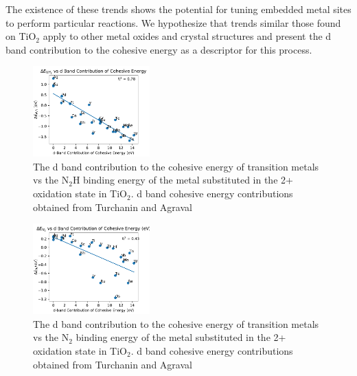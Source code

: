 The existence of these trends shows the potential for tuning embedded metal sites to perform particular reactions. We hypothesize that trends similar those found on TiO$_2$ apply to other metal oxides and crystal structures and present the d band contribution to the cohesive energy as a descriptor for this process.





\begin{figure}
    \centering
    \includegraphics[width=0.4\textwidth]{Images/cohesive_eng_vs_N2H.pdf}
    
    \caption{The d band contribution to the cohesive energy of transition metals vs the N$_2$H binding energy of the metal substituted in the 2+ oxidation state in TiO$_2$. d band cohesive energy contributions obtained from Turchanin and Agraval\cite{Turchanin_2008}}
    \label{fig:N2H_cohesive}
\end{figure}

\begin{figure}
    \centering
    \includegraphics[width=0.4\textwidth]{Images/cohesive_eng_vs_N2.pdf}
    
    \caption{The d band contribution to the cohesive energy of transition metals vs the N$_2$ binding energy of the metal substituted in the 2+ oxidation state in TiO$_2$. d band cohesive energy contributions obtained from Turchanin and Agraval\cite{Turchanin_2008}}
    \label{fig:N2_cohesive}
\end{figure}


